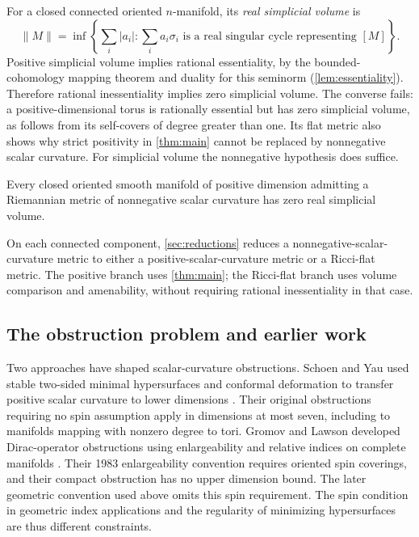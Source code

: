 For a closed connected oriented $n$-manifold, its \emph{real simplicial
volume} is
\[
 \|M\|=\inf\left\{\sum_i|a_i|:
       \sum_i a_i\sigma_i\text{ is a real singular cycle representing }[M]\right\}.
\]
Positive simplicial volume implies rational essentiality, by the
bounded-cohomology mapping theorem and duality for this seminorm
(\cref{lem:essentiality}). Therefore rational inessentiality implies zero
simplicial volume. The converse fails: a positive-dimensional torus is
rationally essential but has zero simplicial volume, as follows from its
self-covers of degree greater than one. Its flat metric also shows why
strict positivity in \cref{thm:main} cannot be replaced by nonnegative
scalar curvature. For simplicial volume the nonnegative hypothesis does
suffice.

\begin{corollary}
\label{cor:simplicial}
Every closed oriented smooth manifold of positive dimension
admitting a Riemannian metric of nonnegative scalar curvature has zero
real simplicial volume.
\end{corollary}

On each connected component, \cref{sec:reductions} reduces a
nonnegative-scalar-curvature metric to either a positive-scalar-curvature
metric or a Ricci-flat metric. The positive branch uses \cref{thm:main};
the Ricci-flat branch uses volume comparison and amenability, without
requiring rational inessentiality in that case.

\subsection{The obstruction problem and earlier work}

Two approaches have shaped scalar-curvature obstructions. Schoen and Yau
used stable two-sided minimal hypersurfaces and conformal deformation to
transfer positive scalar curvature to lower dimensions
\cite{SchoenYauStructure1979,SchoenYauIncompressible1979}. Their original
obstructions requiring no spin assumption apply in dimensions at most seven,
including to manifolds mapping with nonzero degree to tori. Gromov and Lawson
developed Dirac-operator obstructions using enlargeability and relative
indices on complete manifolds \cite{GromovLawson1983}. Their 1983
enlargeability convention requires oriented spin coverings, and their compact
obstruction has no upper dimension bound. The later geometric convention
used above omits this spin requirement. The spin condition in geometric
index applications and the regularity of minimizing hypersurfaces are thus
different constraints.

